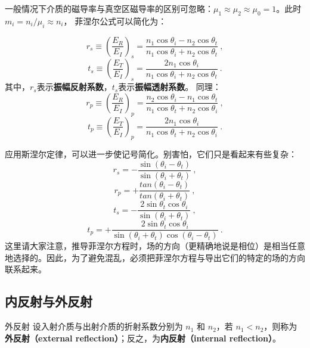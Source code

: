 一般情况下介质的磁导率与真空区磁导率的区别可忽略：$\mu_1\approx\mu_2\approx\mu_0=1$。此时$m_i=n_i/\mu_i \approx n_i$， 菲涅尔公式可以简化为：

\begin{equation}\label{eq_Fresnl_3}
r_s \equiv \left(\frac{E_R}{E_I}\right)_s = \frac{n_1\cos{\theta_i} - n_2\cos\theta_t}{n_1\cos\theta_i + n_2\cos\theta_t}~,
\end{equation}
\begin{equation}\label{eq_Fresnl_4}
t_s \equiv \left(\frac{E_T}{E_I}\right)_s =  \frac{2 n_1\cos\theta_i}{n_1\cos\theta_i + n_2\cos\theta_t}~.
\end{equation}
其中，$r_s$表示\textbf{振幅反射系数}，$t_s$表示\textbf{振幅透射系数}。
同理：
\begin{equation}\label{eq_Fresnl_5}
r_p \equiv \left(\frac{E_R}{E_I}\right)_p = \frac{n_2\cos{\theta_i} - n_1\cos\theta_t}{n_1\cos\theta_t + n_2\cos\theta_i}~,
\end{equation}
\begin{equation}\label{eq_Fresnl_6}
t_p \equiv \left(\frac{E_T}{E_I}\right)_p =  \frac{2 n_1\cos\theta_i}{n_1\cos\theta_t + n_2\cos\theta_i}~.
\end{equation}

应用斯涅尔定律，可以进一步使记号简化。别害怕，它们只是看起来有些复杂：
\begin{equation}\label{eq_Fresnl_7}
r_s = -\frac{\sin(\theta_i - \theta_t)}{\sin(\theta_i + \theta_t)}~,
\end{equation}
\begin{equation}\label{eq_Fresnl_8}
r_p = +\frac{tan(\theta_i - \theta_t)}{tan(\theta_i + \theta_t)}~,
\end{equation}
\begin{equation}\label{eq_Fresnl_9}
t_s = -\frac{2\sin\theta_t\cos\theta_i}{\sin(\theta_i + \theta_t)}~,
\end{equation}
\begin{equation}\label{eq_Fresnl_10}
t_p = +\frac{2\sin\theta_t\cos\theta_i}{\sin(\theta_i + \theta_t)\cos(\theta_i - \theta_t)}~.
\end{equation}
这里请大家注意，推导菲涅尔方程时，场的方向（更精确地说是相位）是相当任意地选择的。因此，为了避免混乱，必须把菲涅尔方程与导出它们的特定的场的方向联系起来。

\subsection{内反射与外反射}
\begin{definition}{外反射}
设入射介质与出射介质的折射系数分别为 $n_1$ 和 $n_2$，若 $n_1<n_2$，则称为\textbf{外反射（external reflection）}；反之，为\textbf{内反射（internal reflection）}。
\end{definition}

